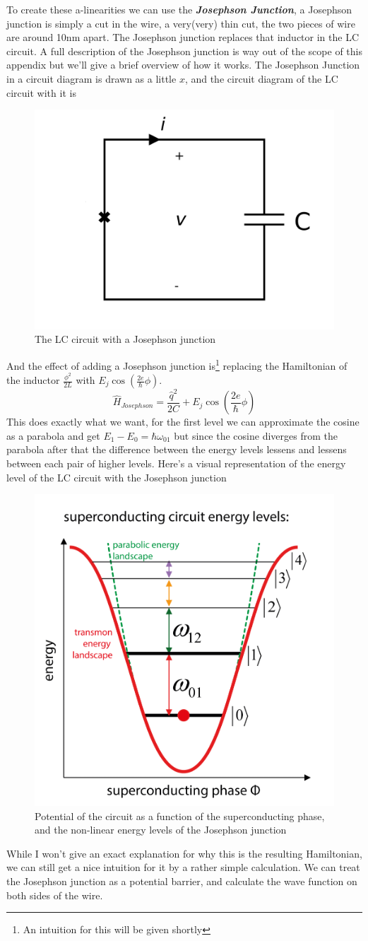 \documentclass[english, a4paper, 12pt, twoside]{article}
\numberwithin{equation}{section} %
\begin{document}
To create these a-linearities we can use the \textbf{\textit{Josephson Junction}}, a Josephson junction is simply a cut in the wire, a very(very) thin cut, the two pieces of wire are around 10nm apart. The Josephson junction replaces that inductor in the LC circuit. A full description of the Josephson junction is way out of the scope of this appendix but we'll give a brief overview of how it works. The Josephson Junction in a circuit diagram is drawn as a little $x$, and the circuit diagram of the LC circuit with it is
\begin{figure}[H]
    \centering
    \includegraphics[width=0.5\columnwidth]{LC-circuit-josephson.png}
    \caption{The LC circuit with a Josephson junction} 
    \label{fig:LC-circuit-Josephson}
\end{figure}
And the effect of adding a Josephson junction is\footnote{An intuition for this will be given shortly} replacing the Hamiltonian of the inductor $\frac{\phi^2}{2L}$ with $E_j \cos (\frac{2e}{\hbar} \phi)$.
\[
    \hat{H}_{Josephson} = \frac{\hat{q}^2}{2C} + E_j \cos (\frac{2e}{\hbar} \phi)
\]
This does exactly what we want, for the first level we can approximate the cosine as a parabola and get $E_1 - E_0 = \hbar \omega_{01}$ but since the cosine diverges from the parabola after that the difference between the energy levels lessens and lessens between each pair of higher levels. Here's a visual representation of the energy level of the LC circuit with the Josephson junction
\begin{figure}[H]
    \centering
    \includegraphics[width=0.5\columnwidth]{josephson-energy-levels.png}
    \caption{Potential of the circuit as a function of the superconducting phase, and the non-linear energy levels of the Josephson junction} 
    \label{fig:Josephson-energy-levels}
\end{figure}
While I won't give an exact explanation for why this is the resulting Hamiltonian, we can still get a nice intuition for it by a rather simple calculation. We can treat the Josephson junction as a potential barrier, and calculate the wave function on both sides of the wire.
\end{document}
